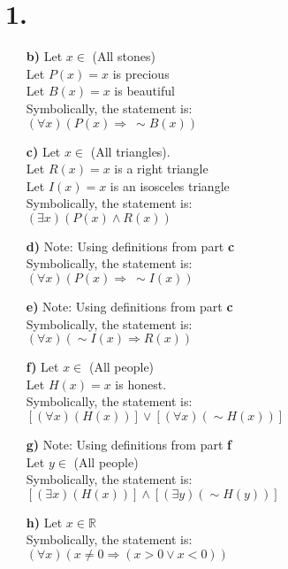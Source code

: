 \documentclass[12pt,letterpaper]{article}
\begin{document}
\section*{1.}


\begin{enumerate}[label= \textbf{\alph*)}]
	\item[\textbf{b)}] Let $x \in $ (All stones)\\
						Let $P(x) = x$ is precious\\
						Let $B(x) = x$ is beautiful\\
						Symbolically, the statement is:\\
						$(\forall x)(P(x) \Rightarrow\ \sim B(x))$ 
	\item[\textbf{c)}] Let $x \in $ (All triangles).\\
						Let $R(x) = x$ is a right triangle\\
						Let $I(x) = x$ is an isosceles triangle\\
						Symbolically, the statement is:\\
						$(\exists x) (P(x) \land R(x))$ 
	\item[\textbf{d)}] Note: Using definitions from part \textbf{c}\\
						Symbolically, the statement is:\\
						$(\forall x) (P(x) \Rightarrow\ \sim I(x))$
	\item[\textbf{e)}] Note: Using definitions from part \textbf{c}\\
						Symbolically, the statement is:\\
						$(\forall x) (\sim I(x) \Rightarrow R(x))$ 
	\item[\textbf{f)}]  Let $x \in$ (All people)\\
						Let $H(x) = x$ is honest.\\
						Symbolically, the statement is:\\
						$[(\forall x)(H(x))] \lor [(\forall x)(\sim H(x))]$ 
	\item[\textbf{g)}] Note: Using definitions from part \textbf{f}\\
						Let $y \in$ (All people)\\ 
						Symbolically, the statement is:\\
						$[(\exists x)(H(x))] \land [(\exists y)(\sim H(y))]$
	\item[\textbf{h)}] Let $x \in \mathbb{R}$\\
						Symbolically, the statement is:\\
						$(\forall x)(x \neq 0 \Rightarrow (x > 0 \lor x < 0))$ 

\end{enumerate}
\end{document}

